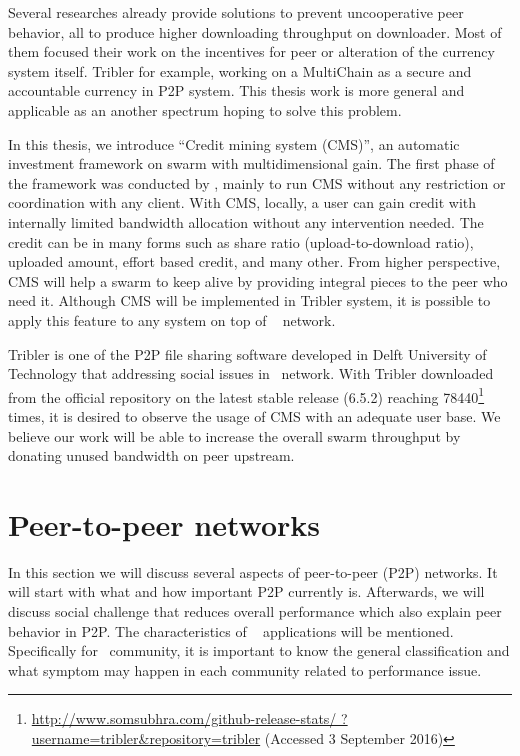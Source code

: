 Several researches already provide solutions to prevent uncooperative peer behavior, all to produce higher downloading throughput on downloader. Most of them focused their work on the incentives for peer or alteration of the currency system itself. Tribler for example, working on a MultiChain \cite{2015:multichain:norberhuis} as a secure and accountable currency in P2P system.  This thesis work is more general and applicable as an another spectrum hoping to solve this problem. 

In this thesis, we introduce ``Credit mining system (CMS)'', an automatic investment framework on swarm with multidimensional gain. The first phase of the framework was conducted by \citeauthor{2015:creditmining:capota}, mainly to run CMS without any restriction or coordination with any client. With CMS, locally, a user can gain credit with internally limited bandwidth allocation without any intervention needed. The credit can be in many forms such as share ratio (upload-to-download ratio), uploaded amount, effort based credit, and many other. From higher perspective, CMS will help a swarm to keep alive by providing integral pieces to the peer who need it. Although CMS will be implemented in Tribler system, it is possible to apply this feature to any system on top of \bt~ network.

Tribler is one of the P2P file sharing software developed in Delft University of Technology that addressing social issues in \bt~network\cite{2008:tribler:pouwelse}. With Tribler downloaded from the official repository on the latest stable release (6.5.2) reaching  78440\footnote{\url{http://www.somsubhra.com/github-release-stats/ ?username=tribler&repository=tribler} (Accessed 3 September 2016)} times, it is desired to observe the usage of CMS with an adequate user base. We believe our work will be able to increase the overall swarm throughput by donating unused bandwidth on peer upstream.


%


\section{Peer-to-peer networks}
In this section we will discuss several aspects of peer-to-peer (P2P) networks. It will start with what and how important P2P currently is. Afterwards, we will discuss social challenge that reduces overall performance which also explain peer behavior in P2P. The characteristics of \bt~ applications will be mentioned. Specifically for \bt~community, it is important to know the general classification and what symptom may happen in each community related to performance issue. 

